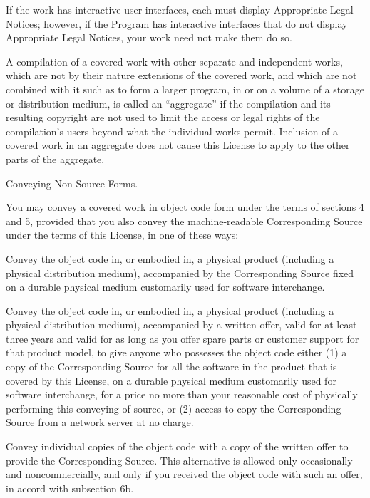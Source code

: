   \item If the work has interactive user interfaces, each must display Appropriate Legal Notices; however, if the Program has interactive interfaces that do not display Appropriate Legal Notices, your work need not make them do so.
  \stopitemize

A compilation of a covered work with other separate and independent works, which are not by their nature extensions of the covered work, and which are not combined with it such as to form a larger program, in or on a volume of a storage or distribution medium, is called an ``aggregate'' if the compilation and its resulting copyright are not used to limit the access or legal rights of the compilation's users beyond what the individual works permit.  Inclusion of a covered work in an aggregate does not cause this License to apply to the other parts of the aggregate.

\item Conveying Non-Source Forms.

You may convey a covered work in object code form under the terms of sections 4 and 5, provided that you also convey the machine-readable Corresponding Source under the terms of this License, in one of these ways:
  \startitemize[n]
  \item Convey the object code in, or embodied in, a physical product (including a physical distribution medium), accompanied by the Corresponding Source fixed on a durable physical medium customarily used for software interchange.

  \item Convey the object code in, or embodied in, a physical product (including a physical distribution medium), accompanied by a written offer, valid for at least three years and valid for as long as you offer spare parts or customer support for that product model, to give anyone who possesses the object code either (1) a copy of the Corresponding Source for all the software in the product that is covered by this License, on a durable physical medium customarily used for software interchange, for a price no more than your reasonable cost of physically performing this conveying of source, or (2) access to copy the Corresponding Source from a network server at no charge.

  \item Convey individual copies of the object code with a copy of the written offer to provide the Corresponding Source.  This alternative is allowed only occasionally and noncommercially, and only if you received the object code with such an offer, in accord with subsection 6b.

